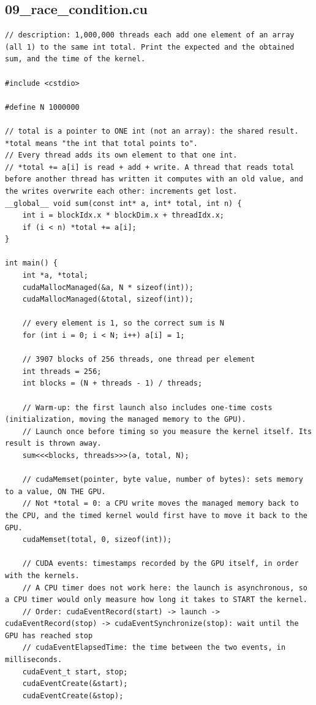 \documentclass[main.tex]{subfiles}
\begin{document}
\subsection{09\_race\_condition.cu}
\begin{lstlisting}[language=CUDA]
// description: 1,000,000 threads each add one element of an array (all 1) to the same int total. Print the expected and the obtained sum, and the time of the kernel.

#include <cstdio>

#define N 1000000

// total is a pointer to ONE int (not an array): the shared result. *total means "the int that total points to".
// Every thread adds its own element to that one int.
// *total += a[i] is read + add + write. A thread that reads total before another thread has written it computes with an old value, and the writes overwrite each other: increments get lost.
__global__ void sum(const int* a, int* total, int n) {
    int i = blockIdx.x * blockDim.x + threadIdx.x;
    if (i < n) *total += a[i];
}

int main() {
    int *a, *total;
    cudaMallocManaged(&a, N * sizeof(int));
    cudaMallocManaged(&total, sizeof(int));

    // every element is 1, so the correct sum is N
    for (int i = 0; i < N; i++) a[i] = 1;

    // 3907 blocks of 256 threads, one thread per element
    int threads = 256;
    int blocks = (N + threads - 1) / threads;

    // Warm-up: the first launch also includes one-time costs (initialization, moving the managed memory to the GPU).
    // Launch once before timing so you measure the kernel itself. Its result is thrown away.
    sum<<<blocks, threads>>>(a, total, N);

    // cudaMemset(pointer, byte value, number of bytes): sets memory to a value, ON THE GPU.
    // Not *total = 0: a CPU write moves the managed memory back to the CPU, and the timed kernel would first have to move it back to the GPU.
    cudaMemset(total, 0, sizeof(int));

    // CUDA events: timestamps recorded by the GPU itself, in order with the kernels.
    // A CPU timer does not work here: the launch is asynchronous, so a CPU timer would only measure how long it takes to START the kernel.
    // Order: cudaEventRecord(start) -> launch -> cudaEventRecord(stop) -> cudaEventSynchronize(stop): wait until the GPU has reached stop
    // cudaEventElapsedTime: the time between the two events, in milliseconds.
    cudaEvent_t start, stop;
    cudaEventCreate(&start);
    cudaEventCreate(&stop);


\end{lstlisting}
\end{document}
